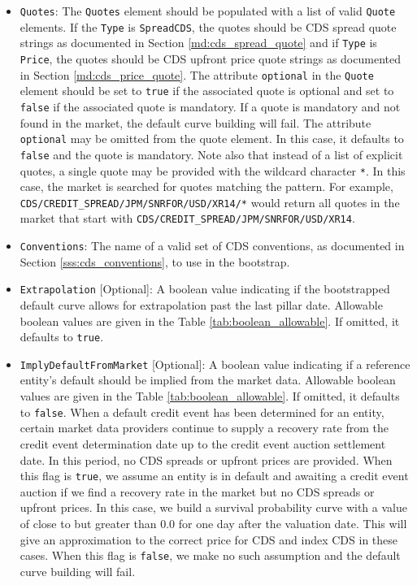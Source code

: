 \begin{itemize}
\item \lstinline!Quotes!:
The \lstinline!Quotes! element should be populated with a list of valid \lstinline!Quote! elements. If the \lstinline!Type! is \lstinline!SpreadCDS!, the quotes should be CDS spread quote strings as documented in Section \ref{md:cds_spread_quote} and if \lstinline!Type! is \lstinline!Price!, the quotes should be CDS upfront price quote strings as documented in Section \ref{md:cds_price_quote}. The attribute \lstinline!optional! in the \lstinline!Quote! element should be set to \lstinline!true! if the associated quote is optional and set to \lstinline!false! if the associated quote is mandatory. If a quote is mandatory and not found in the market, the default curve building will fail. The attribute \lstinline!optional! may be omitted from the quote element. In this case, it defaults to \lstinline!false! and the quote is mandatory. Note also that instead of a list of explicit quotes, a single quote may be provided with the wildcard character \lstinline!*!. In this case, the market is searched for quotes matching the pattern. For example, \lstinline!CDS/CREDIT_SPREAD/JPM/SNRFOR/USD/XR14/*! would return all quotes in the market that start with \lstinline!CDS/CREDIT_SPREAD/JPM/SNRFOR/USD/XR14!.

\item \lstinline!Conventions!:
The name of a valid set of CDS conventions, as documented in Section \ref{sss:cds_conventions}, to use in the bootstrap.

\item \lstinline!Extrapolation! [Optional]:
A boolean value indicating if the bootstrapped default curve allows for extrapolation past the last pillar date. Allowable boolean values are given in the Table \ref{tab:boolean_allowable}. If omitted, it defaults to \lstinline!true!.

\item \lstinline!ImplyDefaultFromMarket! [Optional]:
A boolean value indicating if a reference entity's default should be implied from the market data. Allowable boolean values are given in the Table \ref{tab:boolean_allowable}. If omitted, it defaults to \lstinline!false!. When a default credit event has been determined for an entity, certain market data providers continue to supply a recovery rate from the credit event determination date up to the credit event auction settlement date. In this period, no CDS spreads or upfront prices are provided. When this flag is \lstinline!true!, we assume an entity is in default and awaiting a credit event auction if we find a recovery rate in the market but no CDS spreads or upfront prices. In this case, we build a survival probability curve with a value of close to but greater than 0.0 for one day after the valuation date. This will give an approximation to the correct price for CDS and index CDS in these cases. When this flag is \lstinline!false!, we make no such assumption and the default curve building will fail.


\end{itemize}
